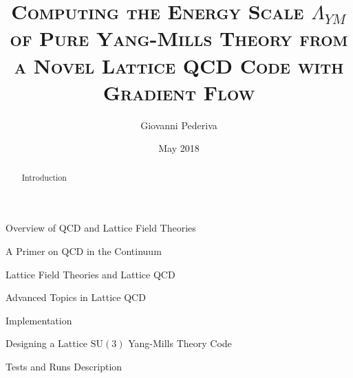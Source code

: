 \documentclass[twoside,english, a4paper, 11pt]{shared/uiofysmaster}
\author{Giovanni Pederiva}
\title{{\scshape Computing the Energy Scale $\Lambda_{YM}$ of Pure Yang-Mills Theory from a Novel Lattice QCD Code with Gradient Flow}}
\date{May 2018}
\begin{document}


\maketitle
\clearpage

\tableofcontents
\clearpage

\begin{abstract}
	
	\begin{chapter}{Introduction}
		\label{chap:intro}
  		
	\end{chapter}
\end{abstract}

\begin{part}{Overview of QCD and Lattice Field Theories}
	\label{part:intro}
	\begin{chapter}{A Primer on QCD in the Continuum}
		\label{chap:qcd_intro}
  		
	\end{chapter}

	\begin{chapter}{Lattice Field Theories and Lattice QCD}
		\label{chap:lattice_intro}
	  	
	\end{chapter}

	\begin{chapter}{Advanced Topics in Lattice QCD}
		\label{chap:grad_intro}
	  	
	\end{chapter}

\end{part}


\begin{part}{Implementation}
	\label{part:implementation}
	\begin{chapter}{Designing a Lattice $\mathrm{SU(3)}$ Yang-Mills Theory Code}
  		\label{chap:code_design}
  		
	\end{chapter}

	\begin{chapter}{Tests and Runs Description}
		\label{chap:test_runs}
		
  \end{chapter}
\end{part}
\end{document}
